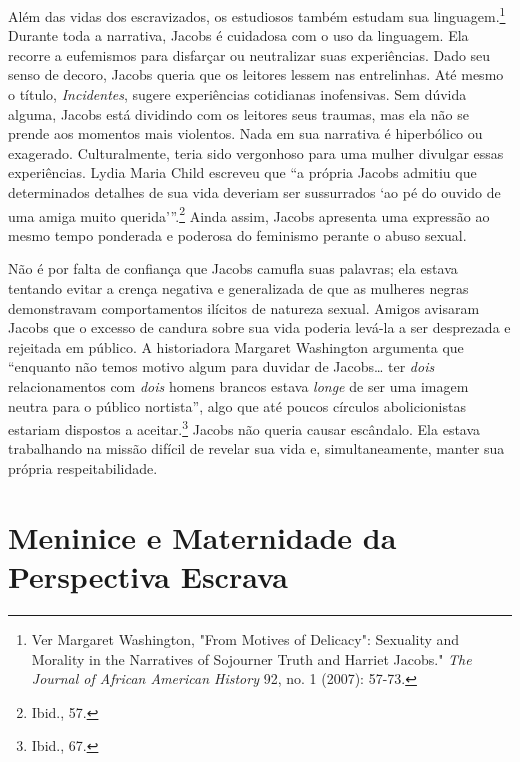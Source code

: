 Além das vidas dos escravizados, os estudiosos também estudam sua
linguagem.\footnote{Ver Margaret Washington, "From Motives of Delicacy":
  Sexuality and Morality in the Narratives of Sojourner Truth and
  Harriet Jacobs." \emph{The Journal of African American History} 92,
  no. 1 (2007): 57-73.} Durante toda a narrativa, Jacobs é cuidadosa com
o uso da linguagem. Ela recorre a eufemismos para disfarçar ou
neutralizar suas experiências. Dado seu senso de decoro, Jacobs queria
que os leitores lessem nas entrelinhas. Até mesmo o título,
\emph{Incidentes}, sugere experiências cotidianas inofensivas. Sem
dúvida alguma, Jacobs está dividindo com os leitores seus traumas, mas
ela não se prende aos momentos mais violentos. Nada em sua narrativa é
hiperbólico ou exagerado. Culturalmente, teria sido vergonhoso para uma
mulher divulgar essas experiências. Lydia Maria Child escreveu que ``a
própria Jacobs admitiu que determinados detalhes de sua vida deveriam
ser sussurrados `ao pé do ouvido de uma amiga muito
querida'''.\footnote{Ibid., 57.} Ainda assim, Jacobs apresenta uma
expressão ao mesmo tempo ponderada e poderosa do feminismo perante o
abuso sexual.

Não é por falta de confiança que Jacobs camufla suas palavras; ela
estava tentando evitar a crença negativa e generalizada de que as
mulheres negras demonstravam comportamentos ilícitos de natureza sexual.
Amigos avisaram Jacobs que o excesso de candura sobre sua vida poderia
levá-la a ser desprezada e rejeitada em público. A historiadora Margaret
Washington argumenta que ``enquanto não temos motivo algum para duvidar
de Jacobs\ldots{} ter \emph{dois} relacionamentos com \emph{dois} homens
brancos estava \emph{longe} de ser uma imagem neutra para o público
nortista'', algo que até poucos círculos abolicionistas estariam
dispostos a aceitar.\footnote{Ibid., 67.} Jacobs não queria causar
escândalo. Ela estava trabalhando na missão difícil de revelar sua vida
e, simultaneamente, manter sua própria respeitabilidade.

\section{Meninice e Maternidade da Perspectiva Escrava}

